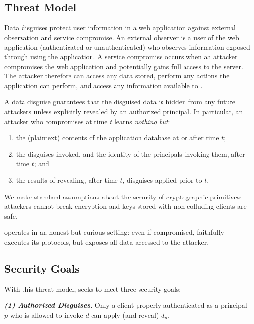 \subsection{Threat Model}
\label{s:threat}

%
Data disguises protect user information in a web application against external observation
and service compromise.
%
An external observer is a user of the web application (authenticated or unauthenticated) who
observes information exposed through using the application.
%
A service compromise occurs when an attacker compromises the web application and potentially
gains full access to the server.
%
The attacker therefore can access any data stored, perform any actions the application can
perform, and access any information available to \sys.
%

%
A data disguise guarantees that the disguised data is hidden from any future attackers unless
explicitly revealed by an authorized principal.
%
In particular, an attacker who compromises \sys at time $t$ learns \emph{nothing but}:
\begin{enumerate}[nosep]
  \item the (plaintext) contents of the application database at or after time $t$;
  \item the disguises invoked, and the identity of the principals invoking them, after time $t$; and
  \item the results of revealing, after time $t$, disguises applied prior to $t$.
\end{enumerate}
%
We make standard assumptions about the security of cryptographic primitives: attackers cannot
break encryption and keys stored with non-colluding clients are safe.
%

%
\sys operates in an honest-but-curious setting: even if compromised, \sys faithfully executes
its protocols, but exposes all data accessed to the attacker.
%

\subsection{Security Goals}
%
With this threat model, \sys seeks to meet three security goals:
%

%
\vspace{6pt}\noindent\textbf{\emph{(1) Authorized Disguises.}}
%
Only a client properly authenticated as a principal $p$ who is allowed to invoke $d$ can apply (and reveal)
$d_p$.
%

